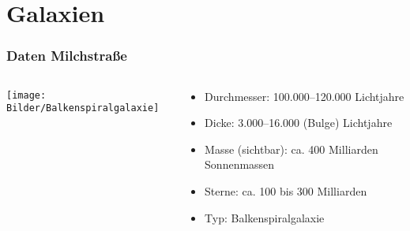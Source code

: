 \documentclass{beamer}
\begin{document}
\section{Galaxien}

\begin{frame}\frametitle{Daten Milchstraße}

\begin{columns}

\begin{column}{.48\textwidth}

\texttt{[image: Bilder/Balkenspiralgalaxie]}

\end{column}

\hfill

\begin{column}{.48\textwidth}

\begin{itemize}
\item Durchmesser: 100.000–120.000 Lichtjahre
\item Dicke: 3.000–16.000 (Bulge) Lichtjahre
\item Masse (sichtbar): ca. 400 Milliarden Sonnenmassen
\item Sterne: ca. 100 bis 300 Milliarden
\item Typ: Balkenspiralgalaxie
\end{itemize}

\end{column}

\end{columns}

\end{frame}
\end{document}
